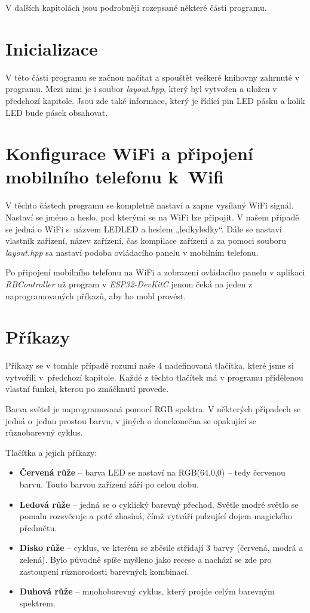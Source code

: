 V dalších kapitolách jsou podrobněji rozepsané některé části programu.


\section{Inicializace}
V této části programu se začnou načítat a spouštět veškeré knihovny zahrnuté v programu. Mezi nimi je i soubor \textit{layout.hpp}, který byl vytvořen a uložen v předchozí kapitole. Jsou zde také informace, který je řídící pin LED pásku a kolik LED bude pásek obsahovat.


\section{Konfigurace WiFi a připojení mobilního telefonu k~Wifi}
V těchto částech programu se kompletně nastaví a zapne vysílaný WiFi signál. Nastaví se jméno a heslo, pod kterými se na WiFi lze připojit. V našem případě se jedná o WiFi s~názvem LEDLED a heslem „ledkyledky“. Dále se nastaví vlastník zařízení, název zařízení, čas kompilace zařízení a za pomoci souboru \textit{layout.hpp} sa nastaví podoba ovládacího panelu v mobilním telefonu. 

Po připojení mobilního telefonu na WiFi a zobrazení ovládacího panelu v aplikaci \textit{RBController} už program v \textit{ESP32-DevKitC} jenom čeká na jeden z naprogramovaných příkazů, aby ho mohl provést.


\section{Příkazy}
Příkazy se v tomhle případě rozumí naše 4 nadefinovaná tlačítka, které jsme si vytvořili v~předchozí kapitole. Každé z těchto tlačítek má v programu přidělenou vlastní funkci, kterou po zmáčknutí provede.

Barva světel je naprogramovaná pomocí RGB spektra. V některých případech se jedná o~jednu prostou barvu, v jiných o donekonečna se opakující se různobarevný cyklus. 

Tlačítka a jejich příkazy: 
\begin{itemize}
	\item \textbf{Červená růže} – barva LED se nastaví na RGB(64,0,0) – tedy červenou barvu. Touto barvou zařízení září po celou dobu. 
	
	\item \textbf{Ledová růže} – jedná se o cyklický barevný přechod. Světle modré světlo se pomalu rozsvěcuje a poté zhasíná, čímž vytváří pulzující dojem magického předmětu. 
	
	\item \textbf{Disko růže} – cyklus, ve kterém se zběsile střídají 3 barvy (červená, modrá a zelená). Bylo původně spíše myšleno jako recese a nachází se zde pro zastoupení různorodosti barevných kombinací. 
	
	\item \textbf{Duhová růže} – mnohobarevný cyklus, který projde celým barevným spektrem. 
\end{itemize}


